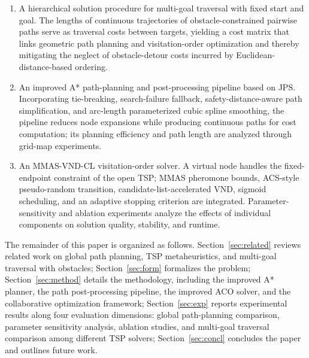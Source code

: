 \documentclass[lettersize,journal]{IEEEtran}
\begin{document}
\begin{enumerate}

\item A hierarchical solution procedure for multi-goal traversal with fixed start and goal. The lengths of continuous trajectories of obstacle-constrained pairwise paths serve as traversal costs between targets, yielding a cost matrix that links geometric path planning and visitation-order optimization and thereby mitigating the neglect of obstacle-detour costs incurred by Euclidean-distance-based ordering.

\item An improved A* path-planning and post-processing pipeline based on JPS. Incorporating tie-breaking, search-failure fallback, safety-distance-aware path simplification, and arc-length parameterized cubic spline smoothing, the pipeline reduces node expansions while producing continuous paths for cost computation; its planning efficiency and path length are analyzed through grid-map experiments.

\item An MMAS-VND-CL visitation-order solver. A virtual node handles the fixed-endpoint constraint of the open TSP; MMAS pheromone bounds, ACS-style pseudo-random transition, candidate-list-accelerated VND, sigmoid scheduling, and an adaptive stopping criterion are integrated. Parameter-sensitivity and ablation experiments analyze the effects of individual components on solution quality, stability, and runtime.

\end{enumerate}

The remainder of this paper is organized as follows. Section~\textcolor{blue}{\ref{sec:related}} reviews related work on global path planning, TSP metaheuristics, and multi-goal traversal with obstacles; Section~\textcolor{blue}{\ref{sec:form}} formalizes the problem; Section~\textcolor{blue}{\ref{sec:method}} details the methodology, including the improved A* planner, the path post-processing pipeline, the improved ACO solver, and the collaborative optimization framework; Section~\textcolor{blue}{\ref{sec:exp}} reports experimental results along four evaluation dimensions: global path-planning comparison, parameter sensitivity analysis, ablation studies, and multi-goal traversal comparison among different TSP solvers; Section~\textcolor{blue}{\ref{sec:concl}} concludes the paper and outlines future work.
\end{document}
